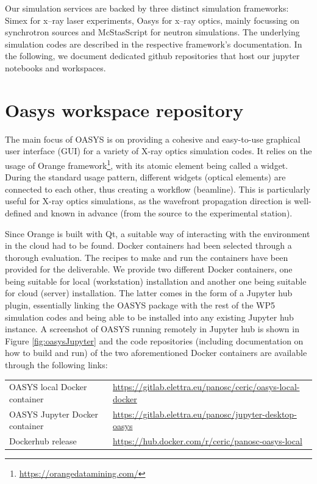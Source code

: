 \documentclass[10pt]{scrartcl}
\begin{document}
Our simulation services are backed by three distinct simulation frameworks:
Simex for x--ray laser experiments, Oasys for x--ray optics, mainly focussing on
synchrotron sources and McStasScript for neutron simulations. The underlying
simulation codes are described in the respective framework's documentation. In
the following, we document dedicated github repositories that host our jupyter
notebooks and workspaces.

\section{Oasys workspace repository}
\label{sec:oasys}
The main focus of OASYS is on providing a cohesive and easy-to-use graphical user interface (GUI) for a variety of X-ray optics simulation codes. It relies on the usage of Orange framework\footnote{\url{https://orangedatamining.com/}}, with its atomic element being called a widget. During the standard usage pattern, different widgets (optical elements) are connected to each other, thus creating a workflow (beamline). This is particularly useful for X-ray optics simulations, as the wavefront propagation direction is well-defined and known in advance (from the source to the experimental station).

Since Orange is built with Qt, a suitable way of interacting with the environment in the cloud had to be found. Docker containers had been selected through a thorough evaluation. The recipes to make and run the containers have been provided for the deliverable. We provide two different Docker containers, one being suitable for local (workstation) installation and another one being suitable for cloud (server) installation. The latter comes in the form of a Jupyter hub plugin, essentially linking the OASYS package with the rest of the WP5 simulation codes and being able to be installed into any existing Jupyter hub instance.  A screenshot of OASYS running remotely in Jupyter hub is shown in Figure \ref{fig:oasysJupyter} and the code repositories (including documentation on how to build and run) of the two aforementioned Docker containers are available through the following links:

\begin{center}
\begin{tabular}{l l}
OASYS local Docker container & \url{https://gitlab.elettra.eu/panosc/ceric/oasys-local-docker} \\
OASYS Jupyter Docker container & \url{https://gitlab.elettra.eu/panosc/jupyter-desktop-oasys} \\
Dockerhub release & \url{https://hub.docker.com/r/ceric/panosc-oasys-local}
\end{tabular}
\end{center}
\end{document}
